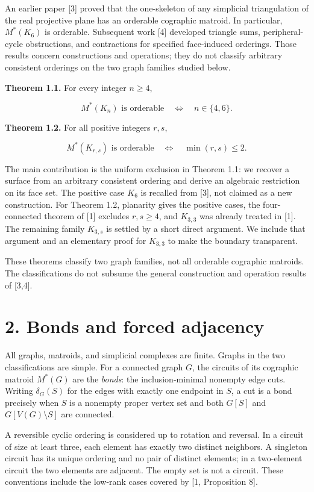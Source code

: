 \documentclass[11pt]{article}
\begin{document}
An earlier paper [3] proved that the one-skeleton of any simplicial triangulation of the real projective plane has an orderable cographic matroid. In particular, $M^*(K_6)$ is orderable. Subsequent work [4] developed triangle sums, peripheral-cycle obstructions, and contractions for specified face-induced orderings. Those results concern constructions and operations; they do not classify arbitrary consistent orderings on the two graph families studied below.

\textbf{Theorem 1.1.} For every integer $n\ge4$,

\[
M^*(K_n)\text{ is orderable}\quad\Longleftrightarrow\quad n\in\{4,6\}.
\]

\textbf{Theorem 1.2.} For all positive integers $r,s$,

\[
M^*(K_{r,s})\text{ is orderable}\quad\Longleftrightarrow\quad\min(r,s)\le2.
\]

The main contribution is the uniform exclusion in Theorem 1.1: we recover a surface from an arbitrary consistent ordering and derive an algebraic restriction on its face set. The positive case $K_6$ is recalled from [3], not claimed as a new construction. For Theorem 1.2, planarity gives the positive cases, the four-connected theorem of [1] excludes $r,s\ge4$, and $K_{3,3}$ was already treated in [1]. The remaining family $K_{3,s}$ is settled by a short direct argument. We include that argument and an elementary proof for $K_{3,3}$ to make the boundary transparent.

These theorems classify two graph families, not all orderable cographic matroids. The classifications do not subsume the general construction and operation results of [3,4].

\section*{2. Bonds and forced adjacency}

All graphs, matroids, and simplicial complexes are finite. Graphs in the two classifications are simple. For a connected graph $G$, the circuits of its cographic matroid $M^*(G)$ are the \emph{bonds}: the inclusion-minimal nonempty edge cuts. Writing $\delta_G(S)$ for the edges with exactly one endpoint in $S$, a cut is a bond precisely when $S$ is a nonempty proper vertex set and both $G[S]$ and $G[V(G)\setminus S]$ are connected.

A reversible cyclic ordering is considered up to rotation and reversal. In a circuit of size at least three, each element has exactly two distinct neighbors. A singleton circuit has its unique ordering and no pair of distinct elements; in a two-element circuit the two elements are adjacent. The empty set is not a circuit. These conventions include the low-rank cases covered by [1, Proposition 8].
\end{document}
